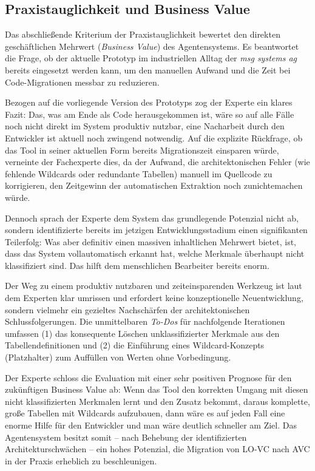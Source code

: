 \subsection{Praxistauglichkeit und Business Value}
\label{subsec:praxistauglichkeit_business_value}

Das abschließende Kriterium der Praxistauglichkeit bewertet den direkten geschäftlichen Mehrwert (\textit{Business Value}) des Agentensystems. Es beantwortet die Frage, ob der aktuelle Prototyp im industriellen Alltag der \textit{msg systems ag} bereits eingesetzt werden kann, um den manuellen Aufwand und die Zeit bei Code-Migrationen messbar zu reduzieren.

Bezogen auf die vorliegende Version des Prototyps zog der Experte ein klares Fazit: \glqq Das, was am Ende als Code herausgekommen ist, wäre so auf alle Fälle noch nicht direkt im System produktiv nutzbar, eine Nacharbeit durch den Entwickler ist aktuell noch zwingend notwendig.\grqq{} Auf die explizite Rückfrage, ob das Tool in seiner aktuellen Form bereits Migrationszeit einsparen würde, verneinte der Fachexperte dies, da der Aufwand, die architektonischen Fehler (wie fehlende Wildcards oder redundante Tabellen) manuell im Quellcode zu korrigieren, den Zeitgewinn der automatischen Extraktion noch zunichtemachen würde.

Dennoch sprach der Experte dem System das grundlegende Potenzial nicht ab, sondern identifizierte bereits im jetzigen Entwicklungsstadium einen signifikanten Teilerfolg: \glqq Was aber definitiv einen massiven inhaltlichen Mehrwert bietet, ist, dass das System vollautomatisch erkannt hat, welche Merkmale überhaupt nicht klassifiziert sind. Das hilft dem menschlichen Bearbeiter bereits enorm.\grqq{} 

Der Weg zu einem produktiv nutzbaren und zeiteinsparenden Werkzeug ist laut dem Experten klar umrissen und erfordert keine konzeptionelle Neuentwicklung, sondern vielmehr ein gezieltes Nachschärfen der architektonischen Schlussfolgerungen. Die unmittelbaren \textit{To-Dos} für nachfolgende Iterationen umfassen (1) das konsequente Löschen unklassifizierter Merkmale aus den Tabellendefinitionen und (2) die Einführung eines Wildcard-Konzepts (Platzhalter) zum Auffüllen von Werten ohne Vorbedingung. 

Der Experte schloss die Evaluation mit einer sehr positiven Prognose für den zukünftigen Business Value ab: \glqq Wenn das Tool den korrekten Umgang mit diesen nicht klassifizierten Merkmalen lernt und den Zusatz bekommt, daraus komplette, große Tabellen mit Wildcards aufzubauen, dann wäre es auf jeden Fall eine enorme Hilfe für den Entwickler und man wäre deutlich schneller am Ziel.\grqq{} Das Agentensystem besitzt somit – nach Behebung der identifizierten Architekturschwächen – ein hohes Potenzial, die Migration von \ac{LO-VC} nach \ac{AVC} in der Praxis erheblich zu beschleunigen.

